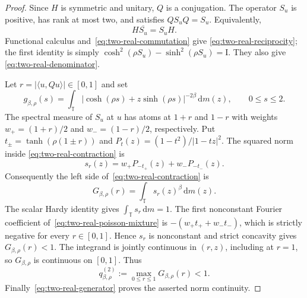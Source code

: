 \documentclass[11pt]{article}
\theoremstyle{remark}
\newcommand{\T}{\mathbb T}
\newcommand{\Id}{\mathrm I}
\newcommand{\dd}{\,\mathrm d}
\begin{document}
\begin{proof}
Since $H$ is symmetric and unitary, $Q$ is a conjugation.  The operator
$S_u$ is positive, has rank at most two, and satisfies $QS_uQ=S_u$.
Equivalently,
\begin{equation}
 H\overline{S_u}=S_uH.
 \label{eq:two-real-commutation}
\end{equation}
Functional calculus and~\eqref{eq:two-real-commutation} give
\eqref{eq:two-real-reciprocity}; the first identity is simply
$\cosh^2(\rho S_u)-\sinh^2(\rho S_u)=\Id$.  They also give
\eqref{eq:two-real-denominator}.

Let $r=|\langle u,Qu\rangle|\in[0,1]$ and set
\begin{equation}
 g_{\beta,\rho}(s)=\int_\T
  |\cosh(\rho s)+z\sinh(\rho s)|^{-2\beta}\dd m(z),
 \qquad 0\leq s\leq2.
 \label{eq:scalar-two-real-gap}
\end{equation}
The spectral measure of $S_u$ at $u$ has atoms at $1+r$ and $1-r$ with
weights $w_+=(1+r)/2$ and $w_-=(1-r)/2$, respectively.  Put
$t_\pm=\tanh(\rho(1\pm r))$ and
$P_t(z)=(1-t^2)/|1-tz|^2$.  The squared norm inside
\eqref{eq:two-real-contraction} is
\begin{equation}
 s_r(z)=w_+P_{-t_+}(z)+w_-P_{-t_-}(z).
 \label{eq:two-real-poisson-mixture}
\end{equation}
Consequently the left side of~\eqref{eq:two-real-contraction} is
\begin{equation}
 G_{\beta,\rho}(r)=\int_\T s_r(z)^\beta\dd m(z).
 \label{eq:two-real-gap-function}
\end{equation}
The scalar Hardy identity gives $\int_\T s_r\dd m=1$.  The first nonconstant
Fourier coefficient of~\eqref{eq:two-real-poisson-mixture} is
$-(w_+t_++w_-t_-)$, which is strictly negative for every $r\in[0,1]$.
Hence $s_r$ is nonconstant and strict concavity gives
$G_{\beta,\rho}(r)<1$.  The integrand is jointly continuous in $(r,z)$,
including at $r=1$, so $G_{\beta,\rho}$ is continuous on $[0,1]$.  Thus
\[
 q^{(2)}_{\beta,\rho}
 :=\max_{0\leq r\leq1}G_{\beta,\rho}(r)<1.
\]
Finally~\eqref{eq:two-real-generator} proves the asserted norm continuity.
\end{proof}
\end{document}
